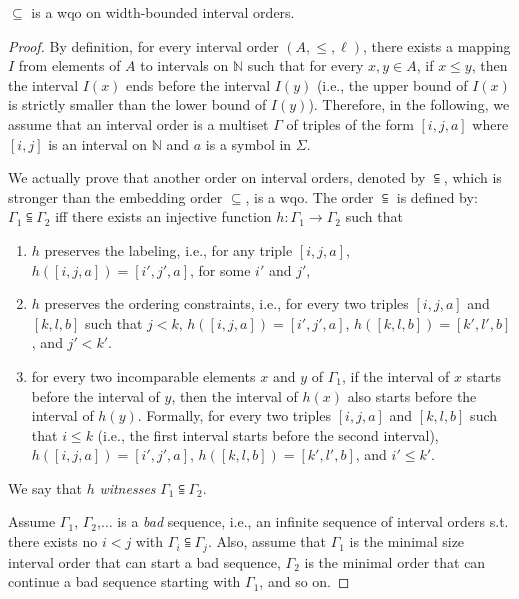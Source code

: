 \begin{lemma}
$\subseteq$ is a wqo on width-bounded interval orders.
\end{lemma}
\begin{proof}
By definition, for every interval order $(A,\leq,\ell)$, there exists a mapping $I$ from elements of $A$ to intervals on $\mathbb{N}$ such that for every $x,y\in A$, if $x\leq y$, then the interval $I(x)$ ends before the interval $I(y)$ (i.e., the upper bound of $I(x)$ is strictly smaller than the lower bound of $I(y)$). %
Therefore, in the following, we assume that an interval order is a multiset $\Gamma$ of triples of the form $[i,j,a]$ where $[i,j]$ is an interval on $\mathbb{N}$ and $a$ is a symbol in $\Sigma$.

We actually prove that another order on interval orders, denoted by $\subseteqq$, which is stronger than the embedding order $\subseteq$, is a wqo. The order $\subseteqq$ is defined by: $\Gamma_1\subseteqq \Gamma_2$ iff there exists an injective function $h:\Gamma_1\rightarrow \Gamma_2$ such that
\begin{enumerate}
	\item $h$ preserves the labeling, i.e., for any triple $[i,j,a]$, $h([i,j,a])=[i',j',a]$, for some $i'$ and $j'$,
	\item $h$ preserves the ordering constraints, i.e., for every two triples $[i,j,a]$ and $[k,l,b]$ such that $j< k$, $h([i,j,a])=[i',j',a]$, $h([k,l,b])=[k',l',b]$, and $j'< k'$.
	\item for every two incomparable elements $x$ and $y$ of $\Gamma_1$, if the interval of $x$ starts before the interval of $y$, then the interval of $h(x)$ also starts before the interval of $h(y)$. Formally, for every two triples $[i,j,a]$ and $[k,l,b]$ such that $i\leq k$ (i.e., the first interval starts before the second interval), $h([i,j,a])=[i',j',a]$, $h([k,l,b])=[k',l',b]$, and $i'\leq k'$.
\end{enumerate}
We say that $h$ \emph{witnesses} $\Gamma_1\subseteqq \Gamma_2$.

Assume $\Gamma_1$, $\Gamma_2$,$\ldots$ is a \emph{bad} sequence, i.e., an infinite sequence of interval orders s.t. there exists no $i < j$ with $\Gamma_i\subseteqq \Gamma_j$. Also, assume that $\Gamma_1$ is the minimal size interval order that can start a bad sequence, $\Gamma_2$ is the minimal order that can continue a bad sequence starting with $\Gamma_1$, and so on.


\end{proof}
